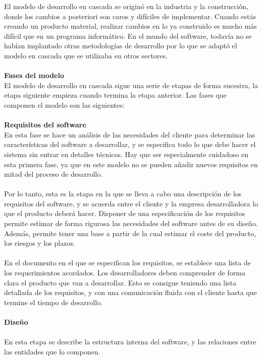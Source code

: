 El modelo de desarrollo en cascada se originó en la industria y la construcción, donde los cambios a posteriori son caros y difíciles de implementar. Cuando estás creando un producto material, realizar cambios en lo ya construido es mucho más difícil que en un programa informático. En el mundo del software, todavía no se habían implantado otras metodologías de desarrollo por lo que se adaptó el modelo en cascada que se utilizaba en otros sectores. 
\\
\\
\textbf{Fases del modelo}
\\
El modelo de desarrollo en cascada sigue una serie de etapas de forma sucesiva, la etapa siguiente empieza cuando termina la etapa anterior. Las fases que componen el modelo son las siguientes:
\\
\\
\textbf{Requisitos del software}
\\
En esta fase se hace un análisis de las necesidades del cliente para determinar las características del software a desarrollar, y se especifica todo lo que debe hacer el sistema sin entrar en detalles técnicos. Hay que ser especialmente cuidadoso en esta primera fase, ya que en este modelo no se pueden añadir nuevos requisitos en mitad del proceso de desarrollo.
\\
\\
Por lo tanto, esta es la etapa en la que se lleva a cabo una descripción de los requisitos del software, y se acuerda entre el cliente y la empresa desarrolladora lo que el producto deberá hacer. Disponer de una especificación de los requisitos permite estimar de forma rigurosa las necesidades del software antes de su diseño. Además, permite tener una base a partir de la cual estimar el coste del producto, los riesgos y los plazos.
\\
\\
En el documento en el que se especifican los requisitos, se establece una lista de los requerimientos acordados. Los desarrolladores deben comprender de forma clara el producto que van a desarrollar. Esto se consigue teniendo una lista detallada de los requisitos, y con una comunicación fluida con el cliente hasta que termine el tiempo de desarrollo.
\\
\\
\textbf{Diseño}
\\
\\
En esta etapa se describe la estructura interna del software, y las relaciones entre las entidades que lo componen.
\\
